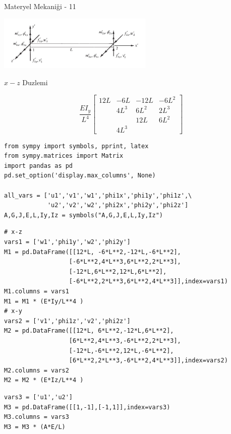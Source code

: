 \documentclass[12pt,fleqn]{article}\usepackage{../../common}
\begin{document}
Materyel Mekaniği - 11


\includegraphics[width=20em]{phy_020_strs_11_01.jpg}


$x-z$ Duzlemi

$$
\frac{EI_y}{L^4}
\left[\begin{array}{cccc}
12L & -6L  & -12L & -6L^2 \\
    & 4L^3 & 6L^2 & 2L^3  \\
    &      & 12L  & 6L^2  \\
                  & 4L^3
\end{array}\right]
$$









\begin{verbatim}
from sympy import symbols, pprint, latex
from sympy.matrices import Matrix
import pandas as pd
pd.set_option('display.max_columns', None)

all_vars = ['u1','v1','w1','phi1x','phi1y','phi1z',\
            'u2','v2','w2','phi2x','phi2y','phi2z']
A,G,J,E,L,Iy,Iz = symbols("A,G,J,E,L,Iy,Iz")
\end{verbatim}

\begin{verbatim}
# x-z
vars1 = ['w1','phi1y','w2','phi2y']
M1 = pd.DataFrame([[12*L, -6*L**2,-12*L,-6*L**2],
                  [-6*L**2,4*L**3,6*L**2,2*L**3],
                  [-12*L,6*L**2,12*L,6*L**2],
                  [-6*L**2,2*L**3,6*L**2,4*L**3]],index=vars1)
M1.columns = vars1
M1 = M1 * (E*Iy/L**4 )
# x-y
vars2 = ['v1','phi1z','v2','phi2z']
M2 = pd.DataFrame([[12*L, 6*L**2,-12*L,6*L**2],
                  [6*L**2,4*L**3,-6*L**2,2*L**3],
                  [-12*L,-6*L**2,12*L,-6*L**2],
                  [6*L**2,2*L**3,-6*L**2,4*L**3]],index=vars2)
M2.columns = vars2
M2 = M2 * (E*Iz/L**4 )
\end{verbatim}

\begin{verbatim}
vars3 = ['u1','u2']
M3 = pd.DataFrame([[1,-1],[-1,1]],index=vars3)
M3.columns = vars3
M3 = M3 * (A*E/L)
\end{verbatim}
\end{document}
